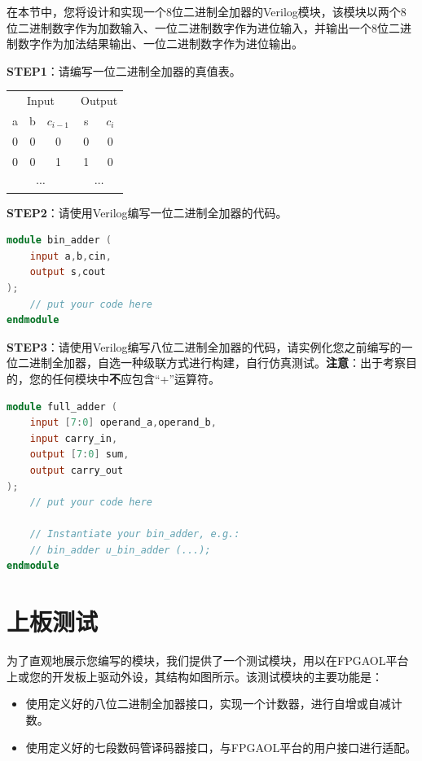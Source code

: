 \documentclass{ctexart}
\begin{document}
在本节中，您将设计和实现一个8位二进制全加器的Verilog模块，该模块以两个8位二进制数字作为加数输入、一位二进制数字作为进位输入，并输出一个8位二进制数字作为加法结果输出、一位二进制数字作为进位输出。

\textbf{STEP1}：请编写一位二进制全加器的真值表。
\begin{table}[H]
    \centering
    \begin{tabular}{ c c c c c }
        \hline
        \multicolumn{3}{c}{Input} & \multicolumn{2}{c}{Output} \\
        \cmidrule(r){1-3} \cmidrule(r){4-5}
        a & b & $c_{i-1}$ & s & $c_i$ \\
        \hline
        0 & 0 & 0 & 0 & 0 \\
        0 & 0 & 1 & 1 & 0 \\
        \multicolumn{3}{c}{$\cdots$} & \multicolumn{2}{c}{$\cdots$} \\
        \hline
    \end{tabular}
\end{table}

\textbf{STEP2}：请使用Verilog编写一位二进制全加器的代码。
\begin{lstlisting}[language=Verilog]
module bin_adder (
    input a,b,cin,
    output s,cout
);
    // put your code here
endmodule
\end{lstlisting}

\textbf{STEP3}：请使用Verilog编写八位二进制全加器的代码，请实例化您之前编写的一位二进制全加器，自选一种级联方式进行构建，自行仿真测试。\textbf{注意}：出于考察目的，您的任何模块中\textbf{不}应包含“+”运算符。
\begin{lstlisting}[language=Verilog]
module full_adder (
    input [7:0] operand_a,operand_b,
    input carry_in,
    output [7:0] sum,
    output carry_out
);
    // put your code here
    
    // Instantiate your bin_adder, e.g.:
    // bin_adder u_bin_adder (...);
endmodule
\end{lstlisting}


\section{上板测试}
为了直观地展示您编写的模块，我们提供了一个测试模块，用以在FPGAOL平台上或您的开发板上驱动外设，其结构如图所示。该测试模块的主要功能是：
\begin{itemize}
    \item 使用定义好的八位二进制全加器接口，实现一个计数器，进行自增或自减计数。
    \item 使用定义好的七段数码管译码器接口，与FPGAOL平台的用户接口进行适配。
\end{itemize}
\end{document}

